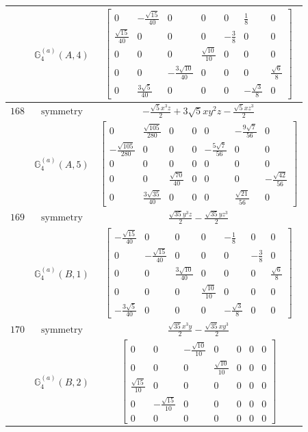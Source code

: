 \documentclass[fleqn,8pt,landscape]{jsarticle}
\begin{document}
\begin{longtable}{ccc}
$  $ & $ \mathbb{G}_{4}^{(a)}(A,4) $ & $ \begin{bmatrix} 0 & - \frac{\sqrt{15}}{40} & 0 & 0 & 0 & \frac{1}{8} & 0 \\ \frac{\sqrt{15}}{40} & 0 & 0 & 0 & - \frac{3}{8} & 0 & 0 \\ 0 & 0 & 0 & \frac{\sqrt{10}}{10} & 0 & 0 & 0 \\ 0 & 0 & - \frac{3 \sqrt{10}}{40} & 0 & 0 & 0 & \frac{\sqrt{6}}{8} \\ 0 & \frac{3 \sqrt{5}}{40} & 0 & 0 & 0 & - \frac{\sqrt{3}}{8} & 0 \end{bmatrix} $ \\ \hline
$ 168 $ & $ \text{symmetry} $ & $ - \frac{\sqrt{5} x^{3} z}{2} + 3 \sqrt{5} x y^{2} z - \frac{\sqrt{5} x z^{3}}{2} $ \\
$  $ & $ \mathbb{G}_{4}^{(a)}(A,5) $ & $ \begin{bmatrix} 0 & \frac{\sqrt{105}}{280} & 0 & 0 & 0 & - \frac{9 \sqrt{7}}{56} & 0 \\ - \frac{\sqrt{105}}{280} & 0 & 0 & 0 & - \frac{5 \sqrt{7}}{56} & 0 & 0 \\ 0 & 0 & 0 & 0 & 0 & 0 & 0 \\ 0 & 0 & \frac{\sqrt{70}}{40} & 0 & 0 & 0 & - \frac{\sqrt{42}}{56} \\ 0 & \frac{3 \sqrt{35}}{40} & 0 & 0 & 0 & \frac{\sqrt{21}}{56} & 0 \end{bmatrix} $ \\ \hline
$ 169 $ & $ \text{symmetry} $ & $ \frac{\sqrt{35} y^{3} z}{2} - \frac{\sqrt{35} y z^{3}}{2} $ \\
$  $ & $ \mathbb{G}_{4}^{(a)}(B,1) $ & $ \begin{bmatrix} - \frac{\sqrt{15}}{40} & 0 & 0 & 0 & - \frac{1}{8} & 0 & 0 \\ 0 & - \frac{\sqrt{15}}{40} & 0 & 0 & 0 & - \frac{3}{8} & 0 \\ 0 & 0 & \frac{3 \sqrt{10}}{40} & 0 & 0 & 0 & \frac{\sqrt{6}}{8} \\ 0 & 0 & 0 & \frac{\sqrt{10}}{10} & 0 & 0 & 0 \\ - \frac{3 \sqrt{5}}{40} & 0 & 0 & 0 & - \frac{\sqrt{3}}{8} & 0 & 0 \end{bmatrix} $ \\ \hline
$ 170 $ & $ \text{symmetry} $ & $ \frac{\sqrt{35} x^{3} y}{2} - \frac{\sqrt{35} x y^{3}}{2} $ \\
$  $ & $ \mathbb{G}_{4}^{(a)}(B,2) $ & $ \begin{bmatrix} 0 & 0 & - \frac{\sqrt{10}}{10} & 0 & 0 & 0 & 0 \\ 0 & 0 & 0 & \frac{\sqrt{10}}{10} & 0 & 0 & 0 \\ \frac{\sqrt{15}}{10} & 0 & 0 & 0 & 0 & 0 & 0 \\ 0 & - \frac{\sqrt{15}}{10} & 0 & 0 & 0 & 0 & 0 \\ 0 & 0 & 0 & 0 & 0 & 0 & 0 \end{bmatrix} $ \\ \hline

\end{longtable}
\end{document}

